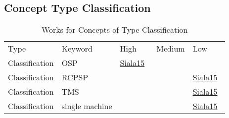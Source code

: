 \clearpage
\subsection{Concept Type Classification}
\label{sec:Classification}
{\scriptsize
\begin{longtable}{lp{3cm}>{\raggedright\arraybackslash}p{6cm}>{\raggedright\arraybackslash}p{6cm}>{\raggedright\arraybackslash}p{8cm}}
\rowcolor{white}\caption{Works for Concepts of Type Classification}\\ \toprule
\rowcolor{white}Type & Keyword & High & Medium & Low\\ \midrule\endhead
\bottomrule
\endfoot
Classification & OSP & \href{../cars/works/Siala15.pdf}{Siala15}~\cite{Siala15} &  & \\
Classification & RCPSP &  &  & \href{../cars/works/Siala15.pdf}{Siala15}~\cite{Siala15}\\
Classification & TMS &  &  & \href{../cars/works/Siala15.pdf}{Siala15}~\cite{Siala15}\\
Classification & single machine &  &  & \href{../cars/works/Siala15.pdf}{Siala15}~\cite{Siala15}\\
\end{longtable}
}

